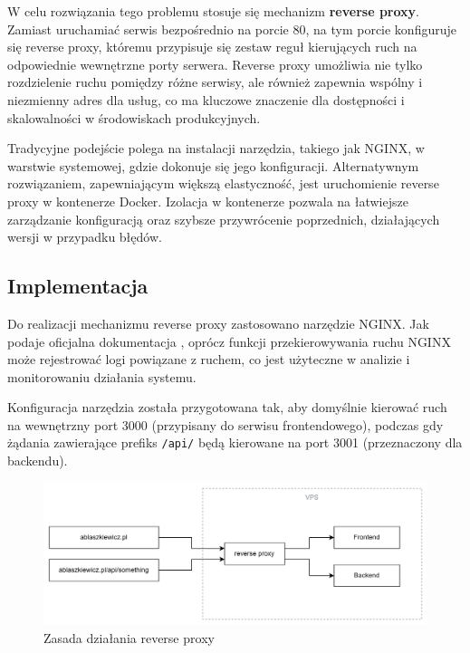 \documentclass{article}
\begin{document}
W celu rozwiązania tego problemu stosuje się mechanizm \textbf{reverse proxy}. Zamiast uruchamiać serwis bezpośrednio na porcie 80, na tym porcie konfiguruje się reverse proxy, któremu przypisuje się zestaw reguł kierujących ruch na odpowiednie wewnętrzne porty serwera. Reverse proxy umożliwia nie tylko rozdzielenie ruchu pomiędzy różne serwisy, ale również zapewnia wspólny i niezmienny adres dla usług, co ma kluczowe znaczenie dla dostępności i skalowalności w środowiskach produkcyjnych.

Tradycyjne podejście polega na instalacji narzędzia, takiego jak NGINX, w warstwie systemowej, gdzie dokonuje się jego konfiguracji. Alternatywnym rozwiązaniem, zapewniającym większą elastyczność, jest uruchomienie reverse proxy w kontenerze Docker. Izolacja w kontenerze pozwala na łatwiejsze zarządzanie konfiguracją oraz szybsze przywrócenie poprzednich, działających wersji w przypadku błędów.

\subsection{Implementacja}

Do realizacji mechanizmu reverse proxy zastosowano narzędzie NGINX. Jak podaje oficjalna dokumentacja \cite{NginxDocs}, oprócz funkcji przekierowywania ruchu NGINX może rejestrować logi powiązane z ruchem, co jest użyteczne w analizie i monitorowaniu działania systemu.

Konfiguracja narzędzia została przygotowana tak, aby domyślnie kierować ruch na wewnętrzny port 3000 (przypisany do serwisu frontendowego), podczas gdy żądania zawierające prefiks \lstinline|/api/| będą kierowane na port 3001 (przeznaczony dla backendu).

\begin{figure}[H]
    \centering
    \includegraphics[width=1\linewidth]{reverseProxyDiagram.png}
    \caption{Zasada działania reverse proxy}
    \label{fig:enter-label}
\end{figure}
\end{document}
